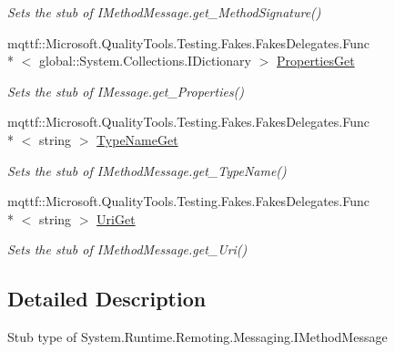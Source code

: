 \begin{DoxyCompactItemize}
\begin{DoxyCompactList}\small\item\em Sets the stub of I\-Method\-Message.\-get\-\_\-\-Method\-Signature()\end{DoxyCompactList}\item 
mqttf\-::\-Microsoft.\-Quality\-Tools.\-Testing.\-Fakes.\-Fakes\-Delegates.\-Func\\*
$<$ global\-::\-System.\-Collections.\-I\-Dictionary $>$ \hyperlink{class_system_1_1_runtime_1_1_remoting_1_1_messaging_1_1_fakes_1_1_stub_i_method_message_aa14614046721212f8d0c11015be69652}{Properties\-Get}
\begin{DoxyCompactList}\small\item\em Sets the stub of I\-Message.\-get\-\_\-\-Properties()\end{DoxyCompactList}\item 
mqttf\-::\-Microsoft.\-Quality\-Tools.\-Testing.\-Fakes.\-Fakes\-Delegates.\-Func\\*
$<$ string $>$ \hyperlink{class_system_1_1_runtime_1_1_remoting_1_1_messaging_1_1_fakes_1_1_stub_i_method_message_a4dba9db71a2fb83b0bd4d0f7cdf80f66}{Type\-Name\-Get}
\begin{DoxyCompactList}\small\item\em Sets the stub of I\-Method\-Message.\-get\-\_\-\-Type\-Name()\end{DoxyCompactList}\item 
mqttf\-::\-Microsoft.\-Quality\-Tools.\-Testing.\-Fakes.\-Fakes\-Delegates.\-Func\\*
$<$ string $>$ \hyperlink{class_system_1_1_runtime_1_1_remoting_1_1_messaging_1_1_fakes_1_1_stub_i_method_message_a4e0b181c42aead8abc7cda64183f0b28}{Uri\-Get}
\begin{DoxyCompactList}\small\item\em Sets the stub of I\-Method\-Message.\-get\-\_\-\-Uri()\end{DoxyCompactList}\end{DoxyCompactItemize}


\subsection{Detailed Description}
Stub type of System.\-Runtime.\-Remoting.\-Messaging.\-I\-Method\-Message



